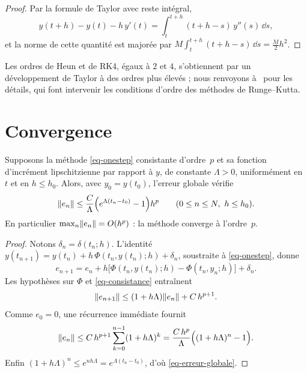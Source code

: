 \begin{proof}
Par la formule de Taylor avec reste intégral,
\[
  y(t+h)-y(t)-h\,y'(t)=\int_t^{t+h}(t+h-s)\,y''(s)\,\dd s,
\]
et la norme de cette quantité est majorée par $M\int_t^{t+h}(t+h-s)\,\dd s=\frac{M}{2}h^2$.
\end{proof}

Les ordres de Heun et de RK4, égaux à $2$ et $4$, s'obtiennent par un développement de Taylor à des ordres plus élevés ; nous renvoyons à~\cite{hairer1993,butcher2016} pour les détails, qui font intervenir les conditions d'ordre des méthodes de Runge--Kutta.

\section{Convergence}\label{sec-convergence}

\begin{theoreme}\label{thm-convergence}
Supposons la méthode \eqref{eq-onestep} consistante d'ordre~$p$ et sa fonction d'incrément lipschitzienne par rapport à $y$, de constante $\Lambda>0$, uniformément en $t$ et en $h\le h_0$. Alors, avec $y_0=y(t_0)$, l'erreur globale vérifie
\begin{equation}\label{eq-erreur-globale}
  \lVert e_n\rVert\le\frac{C}{\Lambda}\Bigl(e^{\Lambda(t_n-t_0)}-1\Bigr)h^{p}\qquad(0\le n\le N,\ h\le h_0).
\end{equation}
En particulier $\max_n\lVert e_n\rVert=O(h^p)$ : la méthode converge à l'ordre~$p$.
\end{theoreme}

\begin{proof}
Notons $\delta_n=\delta(t_n;h)$. L'identité $y(t_{n+1})=y(t_n)+h\,\Phi(t_n,y(t_n);h)+\delta_n$, soustraite à \eqref{eq-onestep}, donne
\[
  e_{n+1}=e_n+h\bigl[\Phi(t_n,y(t_n);h)-\Phi(t_n,y_n;h)\bigr]+\delta_n .
\]
Les hypothèses sur $\Phi$ et \eqref{eq-consistance} entraînent
\[
  \lVert e_{n+1}\rVert\le(1+h\Lambda)\lVert e_n\rVert+C\,h^{p+1}.
\]
Comme $e_0=0$, une récurrence immédiate fournit
\[
  \lVert e_n\rVert\le C\,h^{p+1}\sum_{k=0}^{n-1}(1+h\Lambda)^k
  =\frac{C\,h^{p}}{\Lambda}\Bigl((1+h\Lambda)^n-1\Bigr).
\]
Enfin $(1+h\Lambda)^n\le e^{nh\Lambda}=e^{\Lambda(t_n-t_0)}$, d'où \eqref{eq-erreur-globale}.
\end{proof}


